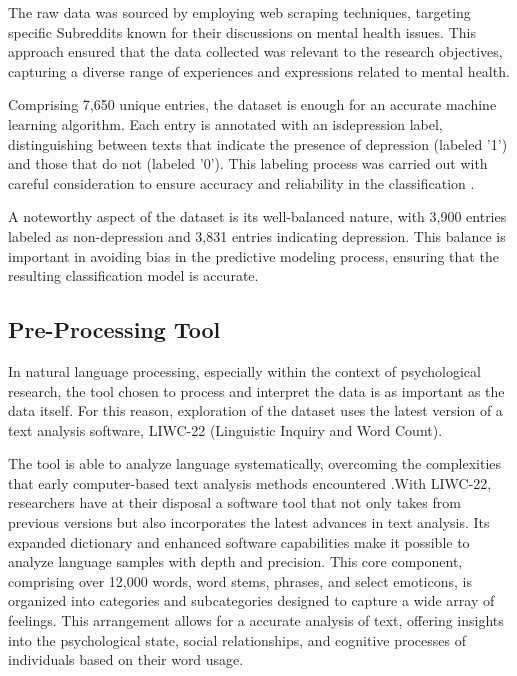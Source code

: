 \documentclass[3p,times,procedia]{elsarticle}
\begin{document}
The raw data was sourced by employing web scraping techniques, targeting specific Subreddits known for their discussions on mental health issues. This approach ensured that the data collected was relevant to the research objectives, capturing a diverse range of experiences and expressions related to mental health.

Comprising 7,650 unique entries, the dataset is enough for an accurate machine learning algorithm. Each entry is annotated with an is\textunderscore depression label, distinguishing between texts that indicate the presence of depression (labeled '1') and those that do not (labeled '0'). This labeling process was carried out with careful consideration to ensure accuracy and reliability in the classification \cite{depressionDataset}.

A noteworthy aspect of the dataset is its well-balanced nature, with 3,900 entries labeled as non-depression and 3,831 entries indicating depression. This balance is important in avoiding bias in the predictive modeling process, ensuring that the resulting classification model is accurate.

\subsection{Pre-Processing Tool}

\quad In natural language processing, especially within the context of psychological research, the tool chosen to process and interpret the data is as important as the data itself. For this reason, exploration of the dataset uses the latest version of a text analysis software, LIWC-22 (Linguistic Inquiry and Word Count).

The tool is able to analyze language systematically, overcoming the complexities that early computer-based text analysis methods encountered \cite{boyd2022development}.With LIWC-22, researchers have at their disposal a software tool that not only takes from previous versions but also incorporates the latest advances in text analysis. Its expanded dictionary and enhanced software capabilities make it possible to analyze language samples with depth and precision. This core component, comprising over 12,000 words, word stems, phrases, and select emoticons, is organized into categories and subcategories designed to capture a wide array of feelings. This arrangement allows for a accurate analysis of text, offering insights into the psychological state, social relationships, and cognitive processes of individuals based on their word usage.
\end{document}
